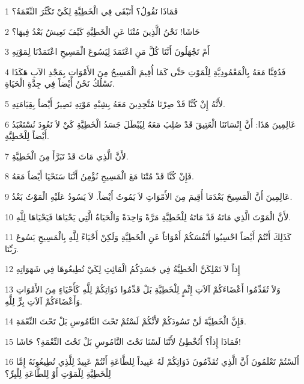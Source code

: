 \par 1 فَمَاذَا نَقُولُ؟ أَنَبْقَى فِي الْخَطِيَّةِ لِكَيْ تَكْثُرَ النِّعْمَةُ؟
\par 2 حَاشَا! نَحْنُ الَّذِينَ مُتْنَا عَنِ الْخَطِيَّةِ كَيْفَ نَعِيشُ بَعْدُ فِيهَا؟
\par 3 أَمْ تَجْهَلُونَ أَنَّنَا كُلَّ مَنِ اعْتَمَدَ لِيَسُوعَ الْمَسِيحِ اعْتَمَدْنَا لِمَوْتِهِ
\par 4 فَدُفِنَّا مَعَهُ بِالْمَعْمُودِيَّةِ لِلْمَوْتِ حَتَّى كَمَا أُقِيمَ الْمَسِيحُ مِنَ الأَمْوَاتِ بِمَجْدِ الآبِ هَكَذَا نَسْلُكُ نَحْنُ أَيْضاً فِي جِدَّةِ الْحَيَاةِ.
\par 5 لأَنَّهُ إِنْ كُنَّا قَدْ صِرْنَا مُتَّحِدِينَ مَعَهُ بِشِبْهِ مَوْتِهِ نَصِيرُ أَيْضاً بِقِيَامَتِهِ.
\par 6 عَالِمِينَ هَذَا: أَنَّ إِنْسَانَنَا الْعَتِيقَ قَدْ صُلِبَ مَعَهُ لِيُبْطَلَ جَسَدُ الْخَطِيَّةِ كَيْ لاَ نَعُودَ نُسْتَعْبَدُ أَيْضاً لِلْخَطِيَّةِ.
\par 7 لأَنَّ الَّذِي مَاتَ قَدْ تَبَرَّأَ مِنَ الْخَطِيَّةِ.
\par 8 فَإِنْ كُنَّا قَدْ مُتْنَا مَعَ الْمَسِيحِ نُؤْمِنُ أَنَّنَا سَنَحْيَا أَيْضاً مَعَهُ.
\par 9 عَالِمِينَ أَنَّ الْمَسِيحَ بَعْدَمَا أُقِيمَ مِنَ الأَمْوَاتِ لاَ يَمُوتُ أَيْضاً. لاَ يَسُودُ عَلَيْهِ الْمَوْتُ بَعْدُ.
\par 10 لأَنَّ الْمَوْتَ الَّذِي مَاتَهُ قَدْ مَاتَهُ لِلْخَطِيَّةِ مَرَّةً وَاحِدَةً وَالْحَيَاةُ الَّتِي يَحْيَاهَا فَيَحْيَاهَا لِلَّهِ.
\par 11 كَذَلِكَ أَنْتُمْ أَيْضاً احْسِبُوا أَنْفُسَكُمْ أَمْوَاتاً عَنِ الْخَطِيَّةِ وَلَكِنْ أَحْيَاءً لِلَّهِ بِالْمَسِيحِ يَسُوعَ رَبِّنَا.
\par 12 إِذاً لاَ تَمْلِكَنَّ الْخَطِيَّةُ فِي جَسَدِكُمُ الْمَائِتِ لِكَيْ تُطِيعُوهَا فِي شَهَوَاتِهِ
\par 13 وَلاَ تُقَدِّمُوا أَعْضَاءَكُمْ آلاَتِ إِثْمٍ لِلْخَطِيَّةِ بَلْ قَدِّمُوا ذَوَاتِكُمْ لِلَّهِ كَأَحْيَاءٍ مِنَ الأَمْوَاتِ وَأَعْضَاءَكُمْ آلاَتِ بِرٍّ لِلَّهِ.
\par 14 فَإِنَّ الْخَطِيَّةَ لَنْ تَسُودَكُمْ لأَنَّكُمْ لَسْتُمْ تَحْتَ النَّامُوسِ بَلْ تَحْتَ النِّعْمَةِ.
\par 15 فَمَاذَا إِذاً؟ أَنُخْطِئُ لأَنَّنَا لَسْنَا تَحْتَ النَّامُوسِ بَلْ تَحْتَ النِّعْمَةِ؟ حَاشَا!
\par 16 أَلَسْتُمْ تَعْلَمُونَ أَنَّ الَّذِي تُقَدِّمُونَ ذَوَاتِكُمْ لَهُ عَبِيداً لِلطَّاعَةِ أَنْتُمْ عَبِيدٌ لِلَّذِي تُطِيعُونَهُ إِمَّا لِلْخَطِيَّةِ لِلْمَوْتِ أَوْ لِلطَّاعَةِ لِلْبِرِّ؟
